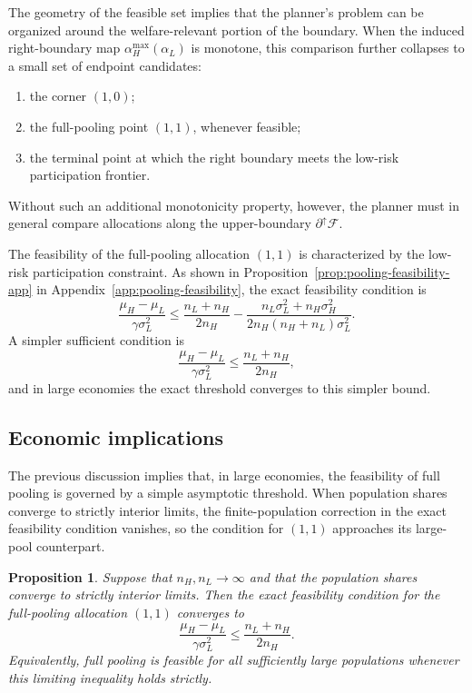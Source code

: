 \documentclass[a4paper,12pt]{article}
\newtheorem{proposition}[theorem]{Proposition}
\theoremstyle{definition}
\theoremstyle{remark}
\newcommand{\1}{\mathbf{1}}
\begin{document}
The geometry of the feasible set implies that the planner's problem can be
organized around the welfare-relevant portion of the boundary. When the induced
right-boundary map \(\alpha_H^{\max}(\alpha_L)\) is monotone, this comparison
further collapses to a small set of endpoint candidates:
\begin{enumerate}[leftmargin=2em]
    \item the corner \((1,0)\);
    \item the full-pooling point \((1,1)\), whenever feasible;
    \item the terminal point at which the right boundary meets the low-risk
    participation frontier.
\end{enumerate}

Without such an
additional monotonicity property, however, the planner must in general compare
allocations along the upper-boundary $\partial^\uparrow\mathcal F$.

The feasibility of the full-pooling allocation \((1,1)\) is characterized by
the low-risk participation constraint. As shown in Proposition~\ref{prop:pooling-feasibility-app} in Appendix~\ref{app:pooling-feasibility}, the exact feasibility condition is
\[
    \frac{\mu_H - \mu_L}{\gamma \sigma_L^2}
    \le
    \frac{n_L + n_H}{2 n_H}
    -
    \frac{n_L\sigma_L^2 + n_H\sigma_H^2}
         {2 n_H (n_H+n_L)\sigma_L^2}.
\]
A simpler sufficient condition is
\[
    \frac{\mu_H - \mu_L}{\gamma \sigma_L^2}
    \le
    \frac{n_L + n_H}{2 n_H},
\]
and in large economies the exact threshold converges to this simpler bound.

\subsection{Economic implications}

The previous discussion implies that, in large economies, the feasibility of
full pooling is governed by a simple asymptotic threshold. When population
shares converge to strictly interior limits, the finite-population correction
in the exact feasibility condition vanishes, so the condition for \((1,1)\)
approaches its large-pool counterpart.

\begin{proposition}
Suppose that \(n_H,n_L \to \infty\) and that the population shares converge to
strictly interior limits. Then the exact feasibility condition for the
full-pooling allocation \((1,1)\) converges to
\[
    \frac{\mu_H-\mu_L}{\gamma\sigma_L^2}
    \le
    \frac{n_L+n_H}{2n_H}.
\]
Equivalently, full pooling is feasible for all sufficiently large populations
whenever this limiting inequality holds strictly.
\end{proposition}
\end{document}
